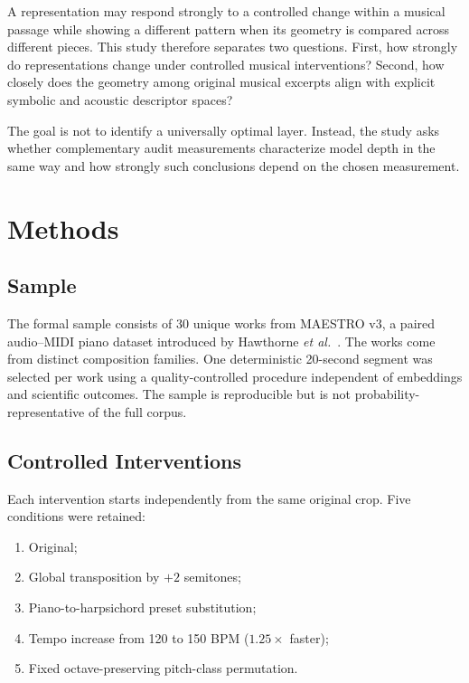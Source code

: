 \documentclass[conference]{IEEEtran}
\begin{document}
A representation may respond strongly to a controlled change within a musical
passage while showing a different pattern when its geometry is compared across
different pieces.
This study therefore separates two questions.
First, how strongly do representations change under controlled musical
interventions?
Second, how closely does the geometry among original musical excerpts align
with explicit symbolic and acoustic descriptor spaces?

The goal is not to identify a universally optimal layer.
Instead, the study asks whether complementary audit measurements characterize
model depth in the same way and how strongly such conclusions depend on the
chosen measurement.

\section{Methods}

\subsection{Sample}

The formal sample consists of 30 unique works from MAESTRO v3, a paired
audio--MIDI piano dataset introduced by Hawthorne \emph{et al.}~\cite{hawthorne2019maestro}.
The works come from distinct composition families.
One deterministic 20-second segment was selected per work using a
quality-controlled procedure independent of embeddings and scientific
outcomes.
The sample is reproducible but is not probability-representative of the full
corpus.

\subsection{Controlled Interventions}

Each intervention starts independently from the same original crop.
Five conditions were retained:

\begin{enumerate}
    \item Original;
    \item Global transposition by $+2$ semitones;
    \item Piano-to-harpsichord preset substitution;
    \item Tempo increase from 120 to 150 BPM ($1.25\times$ faster);
    \item Fixed octave-preserving pitch-class permutation.
\end{enumerate}
\end{document}
